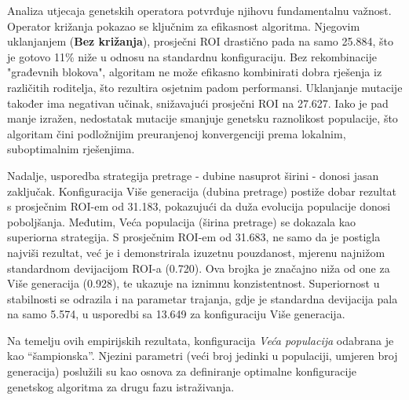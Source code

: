 Analiza utjecaja genetskih operatora potvrđuje njihovu fundamentalnu važnost. Operator križanja pokazao se ključnim za efikasnost algoritma. Njegovim uklanjanjem (\textbf{Bez križanja}), prosječni ROI drastično pada na samo 25.884, što je gotovo 11\% niže u odnosu na standardnu konfiguraciju. Bez rekombinacije "građevnih blokova", algoritam ne može efikasno kombinirati dobra rješenja iz različitih roditelja, što rezultira osjetnim padom performansi. Uklanjanje mutacije također ima negativan učinak, snižavajući prosječni ROI na 27.627. Iako je pad manje izražen, nedostatak mutacije smanjuje genetsku raznolikost populacije, što algoritam čini podložnijim preuranjenoj konvergenciji prema lokalnim, suboptimalnim rješenjima.

Nadalje, usporedba strategija pretrage - dubine nasuprot širini - donosi jasan zaključak. Konfiguracija Više generacija (dubina pretrage) postiže dobar rezultat s prosječnim ROI-em od 31.183, pokazujući da duža evolucija populacije donosi poboljšanja. Međutim, Veća populacija (širina pretrage) se dokazala kao superiorna strategija. S prosječnim ROI-em od 31.683, ne samo da je postigla najviši rezultat, već je i demonstrirala izuzetnu pouzdanost, mjerenu najnižom standardnom devijacijom ROI-a (0.720). Ova brojka je značajno niža od one za Više generacija (0.928), te ukazuje na iznimnu konzistentnost. Superiornost u stabilnosti se odrazila i na parametar trajanja, gdje je standardna devijacija pala na samo 5.574, u usporedbi sa 13.649 za konfiguraciju Više generacija.

Na temelju ovih empirijskih rezultata, konfiguracija \emph{Veća populacija} odabrana je kao ``šampionska''. Njezini parametri (veći broj jedinki u populaciji, umjeren broj generacija) poslužili su kao osnova za definiranje optimalne konfiguracije genetskog algoritma za drugu fazu istraživanja.

